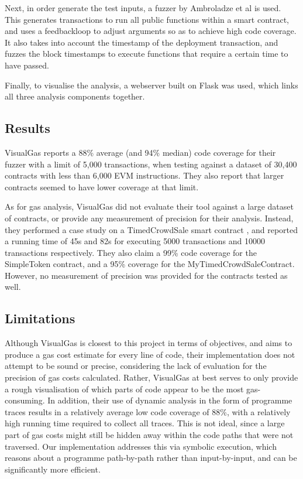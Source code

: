 Next, in order generate the test inputs, a fuzzer by Ambroladze et al \cite{visualgas_fuzzer} is used. This generates 
transactions to run all public functions within a smart contract, and uses a feedbackloop to adjust
arguments so as to achieve high code coverage. It also takes into account the timestamp of the deployment
transaction, and fuzzes the block timestamps to execute functions that require a certain time to have passed.


Finally, to visualise the analysis, a webserver built on Flask was used, which links all three
analysis components together.

\subsection{Results}
VisualGas reports a 88\% average (and 94\% median) code coverage for their fuzzer with a limit of 
5,000 transactions, when testing against a dataset of 30,400 contracts with less than 6,000 EVM
instructions. They also report that larger contracts seemed to have lower coverage at that limit.

As for gas analysis, VisualGas did not evaluate their tool against a large dataset of contracts,
or provide any measurement of precision for their analysis. Instead, they performed a case study
on a TimedCrowdSale smart contract \cite{visualgas_timedcrowdsale}, and reported a running time 
of 45s and 82s for executing 5000 transactions and 10000 transactions respectively. They also 
claim a 99\% code coverage for the SimpleToken contract, and a 95\% coverage for the 
MyTimedCrowdSaleContract. However, no measurement of precision was provided for the contracts tested
as well.

\subsection{Limitations}
Although VisualGas is closest to this project in terms of objectives, and aims to produce a gas cost estimate 
for every line of code, their implementation
does not attempt to be sound or precise, considering the lack of evaluation for the precision 
of gas costs calculated. Rather, VisualGas at best serves to only provide a rough visualisation
of which parts of code appear to be the most gas-consuming. In addition, their use of dynamic 
analysis in the form of programme traces results in a relatively average low code coverage of 88\%, with a
relatively high running time required to collect all traces. This is not ideal, since a large part of
gas costs might still be hidden away within the code paths that were not traversed. Our implementation
addresses this via symbolic execution, which reasons about a programme path-by-path rather than 
input-by-input, and can be significantly more efficient.

